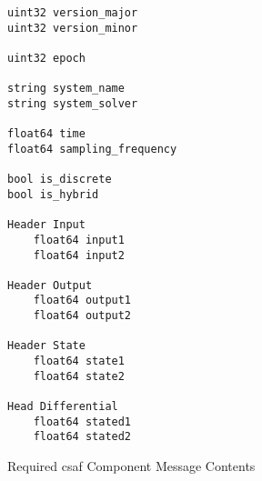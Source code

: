 \begin{figure}
\begin{lstlisting}
uint32 version_major
uint32 version_minor

uint32 epoch

string system_name
string system_solver

float64 time
float64 sampling_frequency

bool is_discrete
bool is_hybrid

Header Input
	float64 input1
	float64 input2
	
Header Output
	float64 output1
	float64 output2
	
Header State
	float64 state1
	float64 state2
	
Head Differential
	float64 stated1
	float64 stated2
\end{lstlisting}
\caption{Required \acrshort{csaf}  Component Message Contents}
\label{fig:cmsg}
\end{figure}


